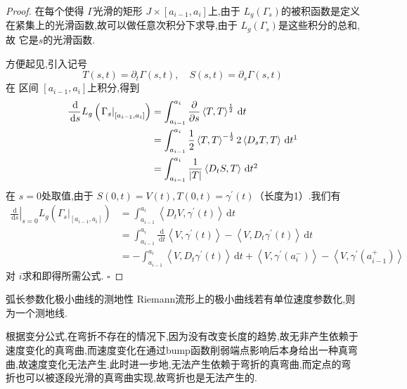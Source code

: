 \documentclass[../../几何与拓扑.tex]{subfiles}
\begin{document}
\begin{proof}
    在每个使得 \(   \Gamma   \)光滑的矩形 \(  J\times \left[ a_{i-1},a_{i} \right]   \)上,由于 \(  L_{g}\left(  \Gamma _{s} \right)   \)的被积函数是定义在紧集上的光滑函数,故可以做任意次积分下求导,由于 \(  L_{g}\left(  \Gamma _{s} \right)   \)是这些积分的总和,故 它是\(  s  \)的光滑函数.
    
    方便起见,引入记号 \[
    T\left( s,t \right)= \partial _{t} \Gamma \left( s,t \right),\quad S\left( s,t \right)= \partial _{s} \Gamma \left( s,t \right)    
    \]在 区间 \(  \left[ a_{i-1},a_{i} \right]   \)上积分,得到  \[
    \begin{aligned}
    \frac{\,\mathrm{d}  }{\,\mathrm{d} s }L_{g}\left( \left.  \Gamma _{s} \right|_{\left[ a_{i-1},a_{i} \right] } \right)& = \int_{a_{i-1}}   ^{a_{i}}\frac{\partial }{\partial s}\left<T,T \right>^{\frac{1}{2}}\,\mathrm{d} t\\ 
     & = \int_{a_{i-1}}^{a_{i}}\frac{1}{2}\left<T,T \right>^{-\frac{1}{2}} 2\left<D_{s}T,T \right>\,\mathrm{d} t \footnotemark \\ 
      & = \int_{a_{i-1}}^{a_{i}} \frac{1}{\left| T \right| }\left<D_{t}S,T \right>\,\mathrm{d} t \footnotemark 
    \end{aligned}
    \]
\footnotetext{\ref{曲线族的对称引理}}
在 \(  s= 0  \)处取值,由于 \(  S\left( 0,t \right)= V\left( t \right),T\left( 0,t \right)=  \gamma ^{\prime} \left( t \right)      \)（长度为1）.我们有 \[
\begin{aligned}
\left. \frac{\,\mathrm{d}  }{\,\mathrm{d} s }  \right|_{s= 0} L_{g}\left(  \Gamma _{s}|_{\left[ a_{i-1},a_{i} \right] } \right)& =  \int_{a_{i-1}}^{a_{i}}\left<D_{t}V, \gamma ^{\prime} \left( t \right)  \right>\,\mathrm{d} t\\ 
 & = \int_{a_{i-1}}^{a_{i}} \frac{\,\mathrm{d}  }{\,\mathrm{d} t } \left<V, \gamma ^{\prime} \left( t \right)  \right>-\left<V, D_{t} \gamma ^{\prime} \left( t \right)  \right>\,\mathrm{d} t\\ 
  & =  -\int_{a_{i-1}}   ^{a_{i}}\left<V,D_{t} \gamma ^{\prime} \left( t \right)  \right>\,\mathrm{d} t+ \left<V, \gamma ^{\prime} \left( a_{i}^{-} \right)  \right>-\left<V, \gamma ^{\prime} \left( a_{i-1}^{+ } \right)  \right>
\end{aligned}
\]  对 \(  i  \)求和即得所需公式. 
\hfill $\square$
\end{proof}
\begin{theorem}{弧长参数化极小曲线的测地性}
    Riemann流形上的极小曲线若有单位速度参数化,则为一个测地线.
\end{theorem}
\begin{note}
    根据变分公式,在弯折不存在的情况下,因为没有改变长度的趋势,故无非产生依赖于速度变化的真弯曲,而速度变化在通过bump函数削弱端点影响后本身给出一种真弯曲,故速度变化无法产生.此时进一步地,无法产生依赖于弯折的真弯曲,而定点的弯折也可以被逐段光滑的真弯曲实现,故弯折也是无法产生的.
\end{note}
\end{document}
